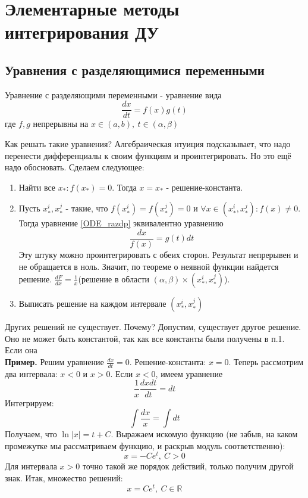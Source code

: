 \section{Элементарные методы интегрирования ДУ}
\subsection{Уравнения с разделяющимися переменными}
\begin{defin}
Уравнение с разделяющими переменными - уравнение вида
\begin{equation}
    \frac{dx}{dt}=f(x)g(t) \label{ODE_razdp}
\end{equation}
где $f,g$ непрерывны на  $x\in(a,b),~t\in(\alpha,\beta)$
\end{defin}
Как решать такие уравнения? Алгебраическая нтуиция подсказывает, что надо 
перенести 
дифференциалы к своим функциям и проинтегрировать. Но это ещё надо обосновать.
Сделаем следующее:\\
\begin{enumerate}
    \item Найти все $x_*:f(x_*)=0$. Тогда $x=x_*$ - решение-константа. 
    \item Пусть  $x^i_*,x^j_*$ - такие, что  $f(x^i_*)=f(x^j_*)=0$ и
    $\forall x\in(x^i_*,x^j_*):f(x)\ne0$. Тогда уравнение \ref{ODE_razdp}
эквивалентно уравнению 
$$\frac{dx}{f(x)}=g(t)dt$$
Эту штуку можно проинтегрировать с обеих сторон. Результат непрерывен и не
обращается в ноль. Значит, по теореме о неявной функции найдется решение. 
$\frac{dF}{dx}=\frac{1}{x}$(решение в области $(\alpha,\beta)\times
(x^i_*,x^j_*)$).
    \item Выписать решение на каждом интервале $(x^i_*,x^j_*)$
\end{enumerate}
Других решений не существует. Почему? Допустим, существует другое решение.
Оно не может быть константой, так как все константы были получены в п.1.
Если она \\
\textbf{Пример.} Решим уравнение $\frac{dx}{dt}=0$. Решение-константа: $x=0$.
Теперь рассмотрим два интервала: $x<0$ и  $x>0$. Если  $x<0$, имеем уравнение
 $$\frac{1}{x}\frac{dxdt}{dt}=dt$$
 Интегрируем:
 $$\int\frac{dx}{x}=\int dt$$
 Получаем, что $\ln|x|=t+C$. Выражаем искомую функцию (не забыв, на каком
 промежутке мы рассматриваем функцию, и раскрыв модуль соответственно):
 $$x=-Ce^t,~C>0$$
Для интервала $x>0$ точно такой же порядок действий, только получим другой 
знак. Итак, множество решений:
$$x=Ce^t,~C\in\mathbb{R}$$
